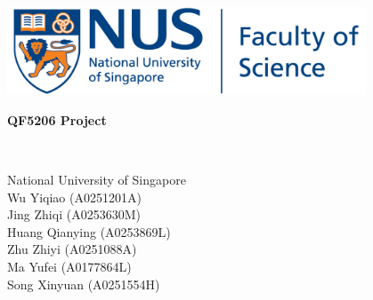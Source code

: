 \begin{titlepage}
   \begin{center}
       \vspace*{1cm}
       \includegraphics[width=0.8\textwidth]{./fos-logo.png}\\
       
	\huge
	
	
       \textbf{QF5206 Project}

	\large
       \vspace{0.5cm}

       \vspace{1.5cm}

       \textbf{}\\
	 \textbf{}
	 
       \vfill
            
            
       \vspace{0.8cm}
     
	National University of Singapore\\
	Wu Yiqiao (A0251201A)\\
	Jing Zhiqi (A0253630M)\\
	Huang Qianying (A0253869L)\\
	Zhu Zhiyi (A0251088A)\\
	Ma Yufei (A0177864L)\\
       Song Xinyuan (A0251554H)\\
~\\
~\\

\small

   \end{center}
\end{titlepage}